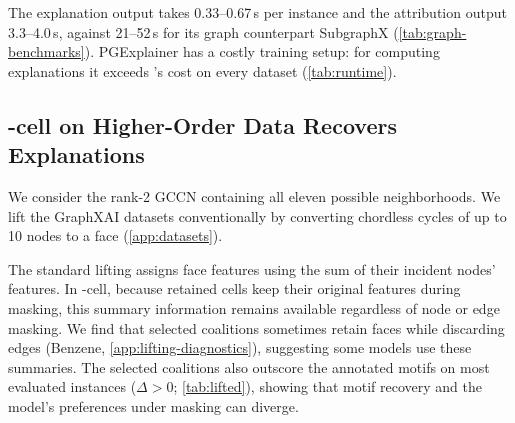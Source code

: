
 The explanation output takes 0.33--0.67\,s per instance and the attribution output 3.3--4.0\,s, against 21--52\,s for its graph counterpart SubgraphX  (\cref{tab:graph-benchmarks}). PGExplainer has a costly training setup: for computing explanations it exceeds \method's cost on every dataset (\cref{tab:runtime}). %

\subsection{\method-cell on Higher-Order Data Recovers Explanations}
\label{sec:predictions-lifted}
\label{sec:predictions-higher}

We consider the rank-2 GCCN containing all eleven possible neighborhoods. We lift the GraphXAI datasets conventionally by converting chordless cycles of up to 10 nodes to a face (\cref{app:datasets}).

The standard lifting assigns face features using the sum of their incident nodes' features. In \method-cell, because retained cells keep their original features during masking, this summary information remains available regardless of node or edge masking. We find that selected coalitions sometimes retain faces while discarding edges (Benzene, \cref{app:lifting-diagnostics}), suggesting some models use these summaries. The selected coalitions also outscore the annotated motifs on most evaluated instances ($\Delta > 0$; \cref{tab:lifted}), showing that motif recovery and the model's preferences under masking can diverge.

